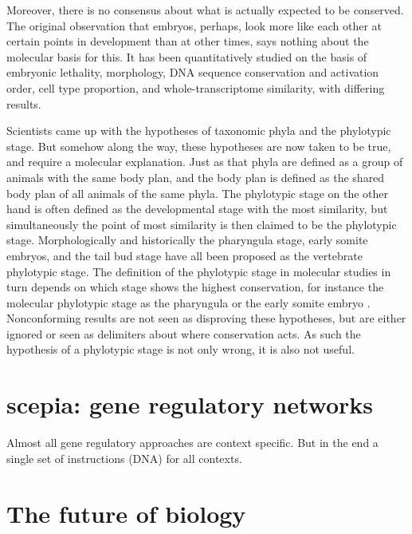 Moreover, there is no consensus about what is actually expected to be conserved. The original observation that embryos, perhaps, look more like each other at certain points in development than at other times, says nothing about the molecular basis for this. It has been quantitatively studied on the basis of embryonic lethality, morphology, DNA sequence conservation and activation order, cell type proportion, and whole-transcriptome similarity, with differing results. 

Scientists came up with the hypotheses of taxonomic phyla and the phylotypic stage. But somehow along the way, these hypotheses are now taken to be true, and require a molecular explanation. Just as that phyla are defined as a group of animals with the same body plan, and the body plan is defined as the shared body plan of all animals of the same phyla\cite{BUDD2000}. The phylotypic stage on the other hand is often defined as the developmental stage with the most similarity, but simultaneously the point of most similarity is then claimed to be the phylotypic stage\cite{Kalinka2010}. Morphologically and historically the pharyngula stage\cite{https://doi.org/10.1093/icb/21.2.391}, early somite embryos\cite{ https://doi.org/10.1046/j.1420-9101.1993.6030457.x}, and the tail bud stage \cite{Slack1993} have all been proposed as the vertebrate phylotypic stage. The definition of the phylotypic stage in molecular studies in turn depends on which stage shows the highest conservation, for instance the molecular phylotypic stage as the pharyngula \cite{Irie2011} or the early somite embryo \cite{DomazetLoso2010}. Nonconforming results are not seen as disproving these hypotheses, but are either ignored or seen as delimiters about where conservation acts. As such the hypothesis of a phylotypic stage is not only wrong, it is also not useful.

\section{scepia: gene regulatory networks}

Almost all gene regulatory approaches are context specific. But in the end a single set of instructions (DNA) for all contexts.


\section{The future of biology}

